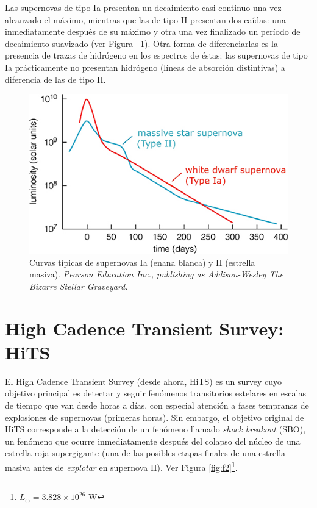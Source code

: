 Las supernovas de tipo Ia presentan un decaimiento casi continuo una vez alcanzado el m\'aximo, mientras que las de tipo II presentan dos ca\'idas: una inmediatamente despu\'es de su m\'aximo y otra una vez finalizado un per\'iodo de decaimiento suavizado (ver Figura ~\ref{fig:f1}). Otra forma de diferenciarlas es la presencia de trazas de hidr\'ogeno en los espectros de \'estas: las supernovas de tipo Ia pr\'acticamente no presentan hidr\'ogeno (l\'ineas de absorci\'on distintivas) a diferencia de las de tipo II.\bigskip

\begin{figure}[h!]
\centering
\includegraphics[scale=.8]{images/clear}
\caption{Curvas t\'ipicas de supernovas Ia (enana blanca) y II (estrella masiva). \textit{ Pearson Education Inc., publishing as Addison-Wesley The Bizarre Stellar Graveyard.}}
\label{fig:f1}
\end{figure}


\section{High Cadence Transient Survey: HiTS}

El High Cadence Transient Survey\cite{hits} (desde ahora, HiTS) es un survey cuyo objetivo principal es detectar y seguir fen\'omenos transitorios estelares en escalas de tiempo que van desde horas a d\'ias, con especial atenci\'on a fases tempranas de explosiones de supernovas (primeras horas). Sin embargo, el objetivo original de HiTS corresponde a la detecci\'on de un fen\'omeno llamado \textit{shock breakout} (SBO), un fen\'omeno que ocurre inmediatamente despu\'es del colapso del n\'ucleo de una estrella roja supergigante (una de las posibles etapas finales de una estrella masiva antes de \textit{explotar} en supernova II). Ver Figura \ref{fig:f2}\footnote{$L_{\odot}= 3.828 \times 10^{26}$ W}.

